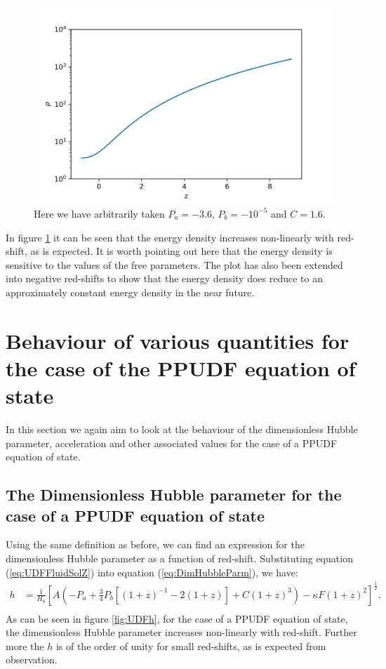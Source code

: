 \documentclass[a4paper, 11pt]{FSKH_623_Report}
\numberwithin{equation}{section}
\newcommand{\brac}[1]{\left(#1\right)}
\newcommand{\bracc}[1]{\left[#1\right]}
\begin{document}
\begin{figure}[H]
\centering
\includegraphics[scale=1]{Figures/UDF_rho.jpg}
\caption{Here we have arbitrarily taken $P_{a}=-3.6$, $P_{b}=-10^{-5}$ and $C=1.6$.}
\label{fig:UDFRho}
\end{figure}
In figure \ref{fig:UDFRho} it can be seen that the energy density increases non-linearly with red-shift, as is expected. It is worth pointing out here that the energy density is sensitive to the values of the free parameters. The plot has also been extended into negative red-shifts to show that the energy density does reduce to an approximately constant energy density in the near future.

\section{Behaviour of various quantities for the case of the PPUDF equation of state}
In this section we again aim to look at the behaviour of the dimensionless Hubble parameter, acceleration and other associated values for the case of a PPUDF equation of state.
\subsection{The Dimensionless Hubble parameter for the case of a PPUDF equation of state}
Using the same definition as before, we can find an expression for the dimensionless Hubble parameter as a function of red-shift. Substituting equation (\ref{eq:UDFFluidSolZ}) into equation (\ref{eq:DimHubbleParm}), we have:
\begin{equation}\label{eq:UDFDimh}
\begin{split}
h &= \frac{1}{H_{0}}\bracc{A\brac{-P_{a}+\frac{3}{4}P_{b}\bracc{\brac{1+z}^{-1}-2\brac{1+z}}+C\brac{1+z}^{3}} -\kappa F \brac{1+z}^{2}}^{\frac{1}{2}}.\\
\end{split}
\end{equation}
As can be seen in figure \ref{fig:UDFh}, for the case of a PPUDF equation of state, the dimensionless Hubble parameter increases non-linearly with red-shift. Further more the $h$ is of the order of unity for small red-shifts, as is expected from observation. 
\end{document}
